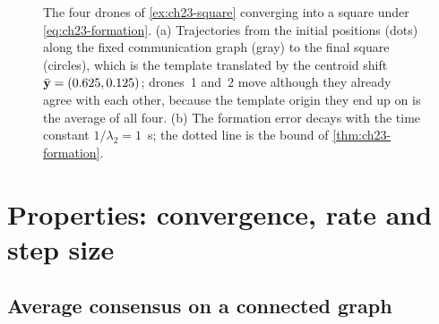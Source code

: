 \begin{figure}[tb]
  \centering
  \caption{The four drones of \cref{ex:ch23-square} converging into a square
  under \cref{eq:ch23-formation}. (a) Trajectories from the initial positions
  (dots) along the fixed communication graph (gray) to the final square
  (circles), which is the template translated by the centroid shift
  $\bar{\mathbf{y}} = (0.625, 0.125)$; drones~1 and~2 move although they already
  agree with each other, because the template origin they end up on is the
  average of all four. (b) The formation error decays with the time constant
  $1/\lambda_2 = 1$~s; the dotted line is the bound of \cref{thm:ch23-formation}.}
  \label{fig:ch23-square}
\end{figure}

\section{Properties: convergence, rate and step size}
\label{sec:ch23-properties}

\subsection{Average consensus on a connected graph}


